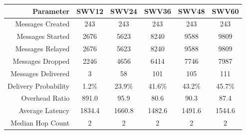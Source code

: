 \documentclass{article}
\begin{document}
\begin{center}
\vspace{6px}
\begin{tabular}{|r|c|c|c|c|c|}
\hline
\textbf{Parameter} & \textbf{SWV12} & \textbf{SWV24} & \textbf{SWV36} & \textbf{SWV48} & \textbf{SWV60} \\ \hline
Messages Created & 243 & 243 & 243 & 243 & 243 \\ \hline
Messages Started & 2676 & 5623 & 8240 & 9588 & 9809 \\ \hline
Messages Relayed & 2676 & 5623 & 8240 & 9588 & 9809 \\ \hline
Messages Dropped & 2246 & 4656 & 6414 & 7746 & 7987 \\ \hline
Messages Delivered & 3 & 58 & 101 & 105 & 111 \\ \hline
Delivery Probability & 1.2\% & 23.9\% & 41.6\% & 43.2\% & 45.7\% \\ \hline
Overhead Ratio & 891.0 & 95.9 & 80.6 & 90.3 & 87.4 \\ \hline
Average Latency & 1834.4 & 1660.8 & 1482.6 & 1491.6 & 1544.6 \\ \hline
Median Hop Count & 2 & 2 & 2 & 2 & 2 \\ \hline
\end{tabular}
\end{center}

\newpage
\end{document}
